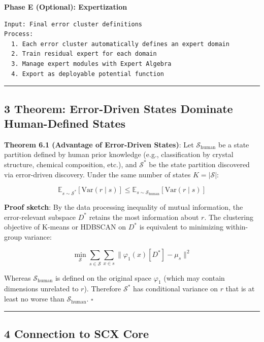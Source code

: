 \documentclass[
  12pt,
]{article}
\begin{document}
\textbf{Phase E (Optional): Expertization}

\begin{verbatim}
Input: Final error cluster definitions
Process:
  1. Each error cluster automatically defines an expert domain
  2. Train residual expert for each domain
  3. Manage expert modules with Expert Algebra
  4. Export as deployable potential function
\end{verbatim}

\begin{center}\rule{0.5\linewidth}{0.5pt}\end{center}

\subsection{3 Theorem: Error-Driven States Dominate Human-Defined
States}\label{theorem-error-driven-states-dominate-human-defined-states}

\textbf{Theorem 6.1 (Advantage of Error-Driven States)}: Let
\(\mathcal{S}_{\text{human}}\)
be a state partition defined by human prior knowledge (e.g., classification by crystal structure, chemical composition, etc.), and \(\mathcal{S}^*\)
be the state partition discovered via error-driven discovery. Under the same number of states \(K = |\mathcal{S}|\):

\[\mathbb{E}_{s \sim \mathcal{S}^*}[\text{Var}(r \mid s)] \leq \mathbb{E}_{s \sim \mathcal{S}_{\text{human}}}[\text{Var}(r \mid s)]\]

\textbf{Proof sketch}: By the data processing inequality of mutual information, the error-relevant subspace \(D^*\)
retains the most information about \(r\). The clustering objective of K-means or HDBSCAN on \(D^*\)
is equivalent to minimizing within-group variance:

\[\min_{\mathcal{S}} \sum_{s \in \mathcal{S}} \sum_{x \in s} \|\varphi_1(x)[D^*] - \mu_s\|^2\]

Whereas \(\mathcal{S}_{\text{human}}\) is defined on the original space \(\varphi_1\) (which may contain dimensions unrelated to
\(r\)). Therefore \(\mathcal{S}^*\) has conditional variance on \(r\) that is at least no worse than \(\mathcal{S}_{\text{human}}\). \(\square\)

\begin{center}\rule{0.5\linewidth}{0.5pt}\end{center}

\subsection{4 Connection to SCX Core}\label{connection-to-scx-core}
\end{document}
